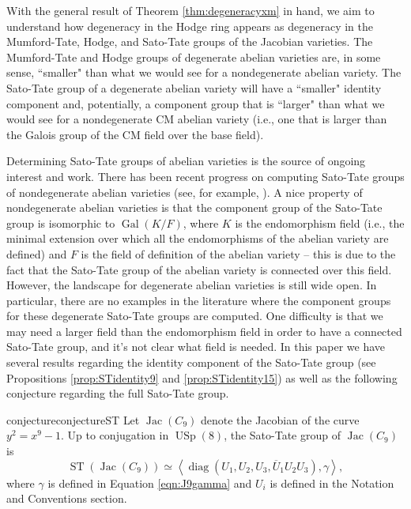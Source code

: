 \documentclass[reqno, oneside, 12pt]{amsart}
\DeclareMathOperator{\Jac}{Jac}
\DeclareMathOperator{\USp}{USp}
\DeclareMathOperator{\ST}{ST}
\DeclareMathOperator{\Gal}{Gal}
\DeclareMathOperator{\diag}{diag}
\theoremstyle{remark}
\numberwithin{equation}{section}
\begin{document}
With the general result of Theorem \ref{thm:degeneracyxm} in hand, we aim to understand how  degeneracy in the Hodge ring appears as  degeneracy in the Mumford-Tate, Hodge, and Sato-Tate groups of the Jacobian varieties. The Mumford-Tate and Hodge groups of degenerate abelian varieties are, in some sense, ``smaller" than what we would see for a nondegenerate abelian variety. The Sato-Tate group of a degenerate abelian variety will have a ``smaller" identity component and, potentially, a component group that is ``larger" than what we would see for a nondegenerate CM abelian variety (i.e., one that is larger than the Galois group of the CM field over the base field).


Determining Sato-Tate groups of abelian varieties is the source of ongoing interest and work. There has been recent progress on computing Sato-Tate groups of nondegenerate abelian varieties (see, for example, \cite{Arora2018, EmoryGoodson2020,emorygoodsonnondegeneracy,FiteGonzalezLario2016, FKS2012,SutherlandGenus3, FiteLorenzoSutherland2018, GoodsonCatalan, LarioSomoza2018}). A nice property of nondegenerate abelian varieties is that the component group of the Sato-Tate group is isomorphic to $\Gal(K/F)$, where $K$ is the endomorphism field (i.e., the minimal extension over which all the endomorphisms of the abelian variety are defined) and $F$ is the field of definition of the abelian variety -- this is due to the fact that the Sato-Tate group of the abelian variety is connected over this field. However, the landscape for degenerate abelian varieties is still wide open. In particular, there are no examples in the literature where the component groups for these degenerate Sato-Tate groups are computed. One difficulty is that we may need a larger field than the endomorphism field in order to have a connected Sato-Tate group, and it's not clear what field is needed. In this paper we have several results regarding the identity component of the Sato-Tate group (see Propositions \ref{prop:STidentity9} and \ref{prop:STidentity15}) as well as the following conjecture regarding the full Sato-Tate group.

\begin{restatable*}{conjecture}{conjectureST}
{\label{conjectureST9}}
Let $\Jac(C_9)$ denote the Jacobian of the curve $y^2=x^9-1$. Up to conjugation in $\USp(8)$, the Sato-Tate group of $\Jac(C_9)$  is $$\ST(\Jac(C_9)) \simeq \left\langle \diag(U_1,U_2,U_3,\overline U_1U_2U_3), \gamma\right\rangle,$$
where $\gamma$ is defined in Equation \eqref{eqn:J9gamma} and $U_i$ is defined in the Notation and Conventions section. 
\end{restatable*}
\end{document}
